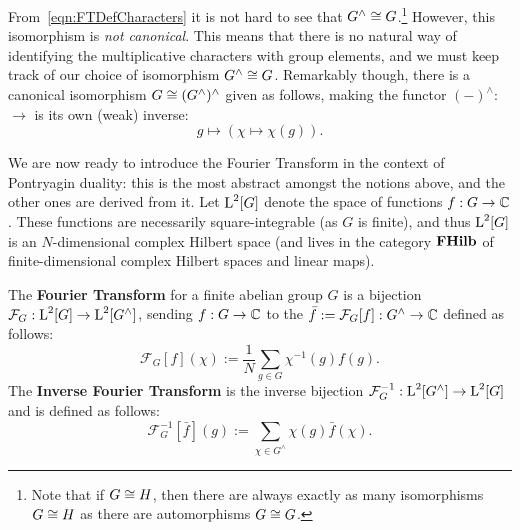 From~\eqref{eqn:FTDefCharacters} it is not hard to see that $G^\wedge \cong G$.\footnote{Note that if $G \cong H$, then there are always exactly as many isomorphisms $G \cong H$ as there are automorphisms $G \cong G$.} However, this isomorphism is \emph{not canonical}. This means that there is no natural way of identifying the multiplicative characters with group elements, and we must keep track of our choice of isomorphism $G^\wedge \cong G$. Remarkably though, there is a canonical isomorphism $G \cong (G^\wedge)^\wedge$ given as follows, making the functor $(-)^{\wedge}:$  $\to$  is its own (weak) inverse:
\begin{equation*}
  g \mapsto (\chi \mapsto \chi(g)).
\end{equation*}

\newcommand{\FourierTransformSym}[1]{\mathcal{F}_{#1}}
\newcommand{\InverseFourierTransformSym}[1]{\mathcal{F}_{#1}^{-1}}
\newcommand{\FourierTransform}[1]{\mathcal{F}_G[#1]}
\newcommand{\InverseFourierTransform}[1]{\mathcal{F}_G^{-1}[#1]}

We are now ready to introduce the Fourier Transform in the context of Pontryagin duality: this is the most abstract amongst the notions above, and the other ones are derived from it. Let $\operatorname{L}^2[G]$ denote the space of functions $f:G\to \mathbb{C}$. These functions are necessarily square-integrable (as $G$ is finite), and thus $\operatorname{L}^2[G]$ is an $N$-dimensional complex Hilbert space (and lives in the category $\mathbf{FHilb}$ of finite-dimensional complex Hilbert spaces and linear maps). 

\begin{defn}
The \textbf{Fourier Transform} for a finite abelian group $G$ is a bijection $\mathcal{F}_G:\operatorname{L}^2[G]\rightarrow\operatorname{L}^2[G^\wedge]$, sending $f:G\to\mathbb{C}$ to the $\bar{f}:=\FourierTransform{f}:G^\wedge\to\complexs$ defined as follows:
\begin{equation}\label{eqn:DefTraditionalFT}
  \FourierTransform{f}(\chi) := \frac{1}{N}\sum_{g \in G}\chi^{-1}(g)f(g).
\end{equation}
The \textbf{Inverse Fourier Transform} is the inverse bijection $\mathcal{F}_G^{-1}: \operatorname{L}^2[G^\wedge] \rightarrow \operatorname{L}^2[G]$ and is defined as follows:
\begin{equation}\label{eqn:DefTraditionalInverseFT}
  \InverseFourierTransform{\bar{f}}(g) := \sum_{\chi \in G^\wedge}\chi(g)\bar{f}(\chi).
\end{equation}
\end{defn}

